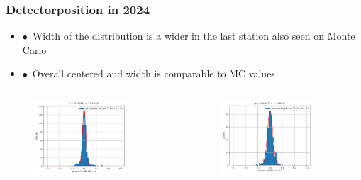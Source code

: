 \documentclass[aspectratio=1610, 12pt, xcolor=dvipsnames]{beamer}
\begin{document}
\begin{frame}\frametitle{Detectorposition in 2024}
  \begin{itemize}
    \setlength\itemsep{0em}
    \item $\bullet$\, Width of the distribution is a wider in the last station \to also seen on Monte Carlo
    \item $\bullet$\, Overall centered and width is comparable to MC values
  \end{itemize}
  \begin{columns}
    \begin{column}[c]{0.5\textwidth}
      \begin{figure}
        \centering
        \includegraphics[width=0.8\textwidth]{plots/2025_plots_goettingen/scifi_stability_TxRz/module_per_cframe/stabi_test_Tx_module_per_cframe_all_modules_T1VX2_HL1.pdf}
      \end{figure}
    \end{column}
    \begin{column}[c]{0.5\textwidth}
      \begin{figure}
        \centering
        \includegraphics[width=0.8\textwidth]{plots/2025_plots_goettingen/scifi_stability_TxRz/module_per_cframe/stabi_test_Tx_module_per_cframe_all_modules_T3VX2_HL1.pdf}
      \end{figure}
    \end{column}
  \end{columns}
\end{frame}
\end{document}
